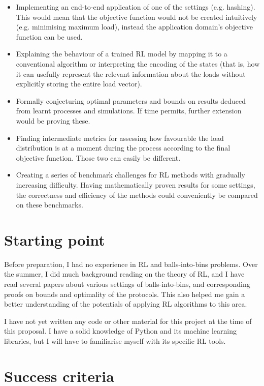 \begin{itemize}
    \item
    Implementing an end-to-end application of one of the settings (e.g. hashing). This would mean that the objective function would not be created intuitively (e.g. minimising maximum load), instead the application domain's objective function can be used.
    \item
    Explaining the behaviour of a trained RL model by mapping it to a conventional algorithm or interpreting the encoding of the states (that is, how it can usefully represent the relevant information about the loads without explicitly storing the entire load vector).
    \item
    Formally conjecturing optimal parameters and bounds on results deduced from learnt processes and simulations. If time permits, further extension would be proving these.
    \item
    Finding intermediate metrics for assessing how favourable the load distribution is at a moment during the process according to the final objective function. Those two can easily be different.
    \item
    Creating a series of benchmark challenges for RL methods with gradually increasing difficulty. Having mathematically proven results for some settings, the correctness and efficiency of the methods could conveniently be compared on these benchmarks.
\end{itemize}


\section*{Starting point}

Before preparation, I had no experience in RL and balls-into-bins problems. Over the summer, I did much background reading on the theory of RL, and I have read several papers about various settings of balls-into-bins, and corresponding proofs on bounds and optimality of the protocols. This also helped me gain a better understanding of the potentials of applying RL algorithms to this area.

I have not yet written any code or other material for this project at the time of this proposal. I have a solid knowledge of Python and its machine learning libraries, but I will have to familiarise myself with its specific RL tools.

\section*{Success criteria}

